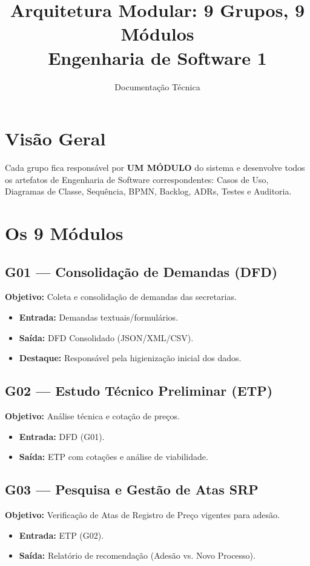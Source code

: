 \documentclass[a4paper,11pt]{article}
\title{
    \textbf{Arquitetura Modular: 9 Grupos, 9 Módulos}\\
    \large Engenharia de Software 1
}
\author{Documentação Técnica}
\date{}
\begin{document}
\maketitle

\section{Visão Geral}
Cada grupo fica responsável por \textbf{UM MÓDULO} do sistema e desenvolve todos os artefatos de Engenharia de Software correspondentes: Casos de Uso, Diagramas de Classe, Sequência, BPMN, Backlog, ADRs, Testes e Auditoria.

\section{Os 9 Módulos}

\subsection{G01 --- Consolidação de Demandas (DFD)}
\textbf{Objetivo:} Coleta e consolidação de demandas das secretarias.
\begin{itemize}
    \item \textbf{Entrada:} Demandas textuais/formulários.
    \item \textbf{Saída:} DFD Consolidado (JSON/XML/CSV).
    \item \textbf{Destaque:} Responsável pela higienização inicial dos dados.
\end{itemize}

\subsection{G02 --- Estudo Técnico Preliminar (ETP)}
\textbf{Objetivo:} Análise técnica e cotação de preços.
\begin{itemize}
    \item \textbf{Entrada:} DFD (G01).
    \item \textbf{Saída:} ETP com cotações e análise de viabilidade.
\end{itemize}

\subsection{G03 --- Pesquisa e Gestão de Atas SRP}
\textbf{Objetivo:} Verificação de Atas de Registro de Preço vigentes para adesão.
\begin{itemize}
    \item \textbf{Entrada:} ETP (G02).
    \item \textbf{Saída:} Relatório de recomendação (Adesão vs. Novo Processo).
\end{itemize}
\end{document}
